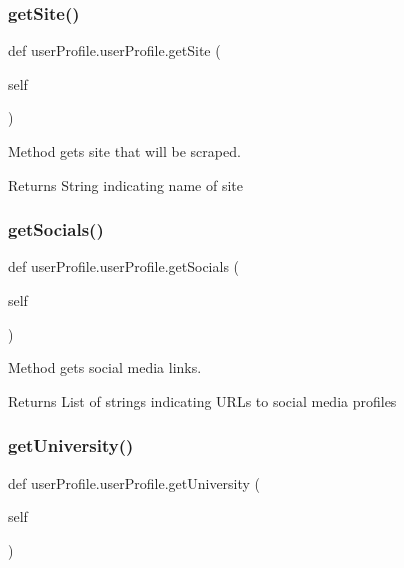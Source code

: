 \subsubsection{\texorpdfstring{get\+Site()}{getSite()}}
{\footnotesize\ttfamily def user\+Profile.\+user\+Profile.\+get\+Site (\begin{DoxyParamCaption}\item[{}]{self }\end{DoxyParamCaption})}



Method gets site that will be scraped. 

\begin{DoxyReturn}{Returns}
String indicating name of site 
\end{DoxyReturn}
\mbox{\label{classuserProfile_1_1userProfile_ab2a8462b4239f832cdc0bc774ca60968}} 
\subsubsection{\texorpdfstring{get\+Socials()}{getSocials()}}
{\footnotesize\ttfamily def user\+Profile.\+user\+Profile.\+get\+Socials (\begin{DoxyParamCaption}\item[{}]{self }\end{DoxyParamCaption})}



Method gets social media links. 

\begin{DoxyReturn}{Returns}
List of strings indicating U\+R\+Ls to social media profiles 
\end{DoxyReturn}
\mbox{\label{classuserProfile_1_1userProfile_a25a425c5045c07739c784f7f8dcff2af}} 
\subsubsection{\texorpdfstring{get\+University()}{getUniversity()}}
{\footnotesize\ttfamily def user\+Profile.\+user\+Profile.\+get\+University (\begin{DoxyParamCaption}\item[{}]{self }\end{DoxyParamCaption})}



